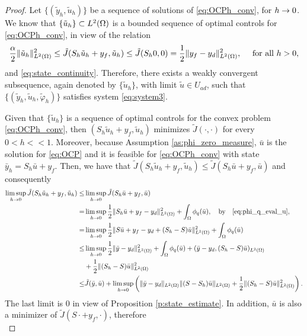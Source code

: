\begin{proof}
Let $\{(\tilde y_h, \tilde u_h)\}$ be a sequence of solutions of \eqref{eq:OCPh_conv}, for  $h \rightarrow 0$. We know that $\{\tilde u_h \} \subset L^2(\Omega)$ is a bounded sequence of optimal controls for \eqref{eq:OCPh_conv}, in view of the relation  $$\frac{\alpha}{2}\|\tilde u_h\|^2_{L^2(\Omega)} \leq \tilde J(S_h \tilde u_h +y_f, \tilde u_h) \leq \tilde J(S_h 0, 0)= \frac{1}{2}\|{y_f-y_d}\|^2_{L^2(\Omega)},\quad \text{ for all }  h>0,$$ 
and \eqref{eq:state_continuity}. Therefore, there exists a weakly convergent subsequence, again denoted by $\{\tilde u_h\}$, with limit $\tilde u \in U_{ad}$, such that   $\{(\tilde y_h, \tilde u_h, \tilde\varphi_h)\}$  
satisfies system \eqref{eq:system3}.


Given that $\{\tilde u_h\}$ is a sequence of optimal controls for the convex problem \eqref{eq:OCPh_conv}, then $(S_h\tilde u_h +y_f,\tilde u_h)$ minimizes $\tilde J (\cdot,\cdot)$ for every $0<h<<1$. Moreover, because Assumption \ref{as:phi_zero_measure}, $\bar u$ is the solution for \eqref{eq:OCP}  and it is feasible for \eqref{eq:OCPh_conv} with state $\bar y_h=S_h\bar u +y_f$. Then,  we have that $\tilde J (S_h \tilde u_h+y_f,\tilde u_h) \leq \tilde J (S_h \bar u+y_f,\bar u) $ and consequently
\begin{align*}
	\limsup_{h \to 0} \tilde J(S_h \tilde u_h+y_f, \tilde u_h) \leq & \limsup_{h\to 0} \tilde J(S_h \bar u+y_f, \bar u)  \nonumber\\
	 = & \limsup_{h\to 0} \frac12 \lVert S_h \bar u+y_f -y_d \rVert^2_{L^2(\Omega)} + \int_\Omega \phi_q(\bar u),  \quad \text{by} \quad \eqref{eq:phi_q_eval_u}, \nonumber \\
   = & \limsup_{h\to 0} \frac12 \lVert S \bar u+y_f -y_d + (S_h -S)\bar u \rVert^2_{L^2(\Omega)} + \int_\Omega \phi_q (\bar u) \nonumber \\
   \leq & \limsup_{h\to 0} \frac12 \lVert \bar y -y_d \rVert^2_{L^2(\Omega)}+ \int_\Omega \phi_q (\bar u) + (\bar y-y_d,(S_h -S)\bar u)_{L^2(\Omega)}\\
   &+\frac12 \lVert (S_h -S)\bar u \rVert^2_{L^2(\Omega)}  \nonumber \\
   \leq & \tilde J(\bar y,\bar u) \nonumber + \limsup_{h\to 0}\left(\| \bar y -y_d\|_{L^2(\Omega)}\|(S -S_h)\bar u\|_{L^2(\Omega)}+\frac12 \lVert (S_h -S)\bar u \rVert^2_{L^2(\Omega)}\right). \nonumber
\end{align*}
The last limit is $0$ in view of Proposition  \ref{p:state_estimate}. In addition, $\bar u$ is also a minimizer of $\tilde J(S\cdot+y_f, \cdot)$, therefore
\begin{equation}

\end{equation}
\end{proof}
